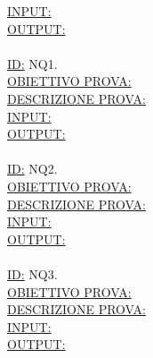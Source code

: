 \documentclass[11pt,titlepage,a4paper]{report}
\begin{document}
\underline{INPUT:}  \\
\underline{OUTPUT:}  \\
\\
\underline{ID:} NQ1.\\
\underline{OBIETTIVO PROVA:}  \\
\underline{DESCRIZIONE PROVA:}  \\
\underline{INPUT:}  \\
\underline{OUTPUT:}  \\
\\
\underline{ID:} NQ2.\\
\underline{OBIETTIVO PROVA:}  \\
\underline{DESCRIZIONE PROVA:}  \\
\underline{INPUT:}  \\
\underline{OUTPUT:}  \\
\\
\underline{ID:} NQ3.\\
\underline{OBIETTIVO PROVA:}  \\
\underline{DESCRIZIONE PROVA:}  \\
\underline{INPUT:}  \\
\underline{OUTPUT:}  \\
\\
\end{document}
